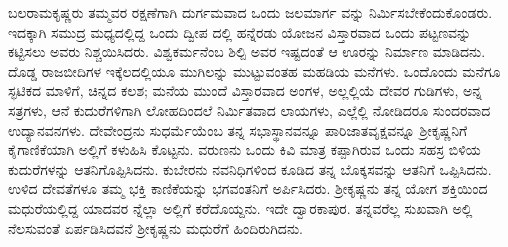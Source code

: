ಬಲರಾಮಕೃಷ್ಣರು ತಮ್ಮವರ ರಕ್ಷಣೆಗಾಗಿ ದುರ್ಗಮವಾದ ಒಂದು ಜಲಮಾರ್ಗ ವನ್ನು ನಿರ್ಮಿಸಬೇಕೆಂದುಕೊಂಡರು. ಇದಕ್ಕಾಗಿ ಸಮುದ್ರ ಮಧ್ಯದಲ್ಲಿದ್ದ ಒಂದು ದ್ವೀಪ ದಲ್ಲಿ ಹನ್ನೆರಡು ಯೋಜನ ವಿಸ್ತಾರವಾದ ಒಂದು ಪಟ್ಟಣವನ್ನು ಕಟ್ಟಿಸಲು ಅವರು ನಿಶ್ಚಯಿಸಿದರು. ವಿಶ್ವಕರ್ಮನೆಂಬ ಶಿಲ್ಪಿ ಅವರ ಇಷ್ಟದಂತೆ ಆ ಊರನ್ನು ನಿರ್ಮಾಣ ಮಾಡಿದನು. ದೊಡ್ಡ ರಾಜಬೀದಿಗಳ ಇಕ್ಕೆಲದಲ್ಲಿಯೂ ಮುಗಿಲನ್ನು ಮುಟ್ಟುವಂತಹ ಮಹಡಿಯ ಮನೆಗಳು. ಒಂದೊಂದು ಮನೆಗೂ ಸ್ಫಟಿಕದ ಮಾಳಿಗೆ, ಚಿನ್ನದ ಕಲಶ; ಮನೆಯ ಮುಂದೆ ವಿಸ್ತಾರವಾದ ಅಂಗಳ, ಅಲ್ಲಲ್ಲಿಯೆ ದೇವರ ಗುಡಿಗಳು, ಅನ್ನ ಸತ್ರಗಳು, ಆನೆ ಕುದುರೆಗಳಿಗಾಗಿ ಲೋಹದಿಂದಲೆ ನಿರ್ಮಿತವಾದ ಲಾಯಗಳು, ಎಲ್ಲೆಲ್ಲಿ ನೋಡಿದರೂ ಸುಂದರವಾದ ಉದ್ಯಾನವನಗಳು. ದೇವೇಂದ್ರನು ಸುಧರ್ಮೆಯೆಂಬ ತನ್ನ ಸಭಾಸ್ಥಾನವನ್ನೂ ಪಾರಿಜಾತವೃಕ್ಷವನ್ನೂ ಶ್ರೀಕೃಷ್ಣನಿಗೆ ಕೈಗಾಣಿಕೆಯಾಗಿ ಅಲ್ಲಿಗೆ ಕಳುಹಿಸಿ ಕೊಟ್ಟನು. ವರುಣನು ಒಂದು ಕಿವಿ ಮಾತ್ರ ಕಪ್ಪಾಗಿರುವ ಒಂದು ಸಹಸ್ರ ಬಿಳಿಯ ಕುದುರೆಗಳನ್ನು ಆತನಿಗೊಪ್ಪಿಸಿದನು. ಕುಬೇರನು ನವನಿಧಿಗಳಿಂದ ಕೂಡಿದ ತನ್ನ ಬೊಕ್ಕಸವನ್ನು ಆತನಿಗೆ ಒಪ್ಪಿಸಿದನು. ಉಳಿದ ದೇವತೆಗಳೂ ತಮ್ಮ ಭಕ್ತಿ ಕಾಣಿಕೆಯನ್ನು ಭಗವಂತನಿಗೆ ಅರ್ಪಿಸಿದರು. ಶ್ರೀಕೃಷ್ಣನು ತನ್ನ ಯೋಗ ಶಕ್ತಿಯಿಂದ ಮಧುರೆಯಲ್ಲಿದ್ದ ಯಾದವರ ನ್ನೆಲ್ಲಾ ಅಲ್ಲಿಗೆ ಕರೆದೊಯ್ದನು. ಇದೇ ದ್ವಾರಕಾಪುರ. ತನ್ನವರೆಲ್ಲ ಸುಖವಾಗಿ ಅಲ್ಲಿ ನೆಲಸುವಂತೆ ಏರ್ಪಡಿಸಿದವನೆ ಶ್ರೀಕೃಷ್ಣನು ಮಧುರೆಗೆ ಹಿಂದಿರುಗಿದನು.

